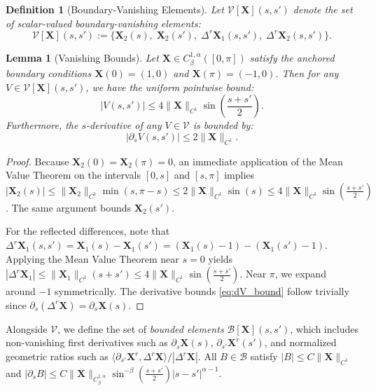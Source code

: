 \documentclass{amsart}
\newtheorem{definition}[theorem]{Definition}
\newtheorem{lemma}[theorem]{Lemma}
\begin{document}
\begin{definition}[Boundary-Vanishing Elements]  \label{def:boundaryvanishelement}
Let $\mathcal{V}[\mathbf{X}](s,s')$ denote the set of scalar-valued boundary-vanishing elements:
\[
\mathcal{V}[\mathbf{X}](s,s') := \big\{ \mathbf{X}_2(s),\; \mathbf{X}_2(s'),\; \Delta^r \mathbf{X}_1(s,s'),\; \Delta^r \mathbf{X}_2(s,s') \big\}.
\]
\end{definition}

\begin{lemma}[Vanishing Bounds]\label{lem:vanishing_bounds}
Let $\mathbf{X} \in C^{1,\alpha}_\beta([0,\pi])$ satisfy the anchored boundary conditions $\mathbf{X}(0) = (1,0)$ and $\mathbf{X}(\pi) = (-1,0)$. Then for any $V \in \mathcal{V}[\mathbf{X}](s,s')$, we have the uniform pointwise bound:
\[
|V(s,s')| \le 4 \|\mathbf{X}\|_{C^1} \sin\left(\frac{s+s'}{2}\right).
\]
Furthermore, the $s$-derivative of any $V \in \mathcal{V}$ is bounded by:
\begin{equation}\label{eq:dV_bound}
|\partial_s V(s,s')| \le 2 \|\mathbf{X}\|_{C^1}.
\end{equation}
\end{lemma}

\begin{proof}
Because $\mathbf{X}_2(0) = \mathbf{X}_2(\pi) = 0$, an immediate application of the Mean Value Theorem on the intervals $[0,s]$ and $[s,\pi]$ implies $|\mathbf{X}_2(s)| \le \|\mathbf{X}_2\|_{C^1} \min(s, \pi-s) \le 2\|\mathbf{X}\|_{C^1} \sin(s) \le 4\|\mathbf{X}\|_{C^1} \sin(\frac{s+s'}{2})$. The same argument bounds $\mathbf{X}_2(s')$.

For the reflected differences, note that $\Delta^r \mathbf{X}_1(s,s') = \mathbf{X}_1(s) - \mathbf{X}_1(s') = (\mathbf{X}_1(s) - 1) - (\mathbf{X}_1(s') - 1)$. Applying the Mean Value Theorem near $s=0$ yields $|\Delta^r \mathbf{X}_1| \le \|\mathbf{X}_1\|_{C^1}(s + s') \le 4\|\mathbf{X}\|_{C^1} \sin(\frac{s+s'}{2})$. Near $\pi$, we expand around $-1$ symmetrically. The derivative bounds \eqref{eq:dV_bound} follow trivially since $\partial_s (\Delta^r \mathbf{X}) = \partial_s \mathbf{X}(s)$.
\end{proof}

Alongside $\mathcal{V}$, we define the set of \emph{bounded elements} $\mathcal{B}[\mathbf{X}](s,s')$, which includes non-vanishing first derivatives such as $\partial_s \mathbf{X}(s)$, $\partial_{s'} \mathbf{X}^r(s')$, and normalized geometric ratios such as $\langle \partial_{s'}\mathbf{X}^r, \Delta^r \mathbf{X} \rangle / |\Delta^r \mathbf{X}|$. All $B \in \mathcal{B}$ satisfy $|B| \le C \|\mathbf{X}\|_{C^1}$ and $|\partial_s B| \le C \|\mathbf{X}\|_{C^{1,\alpha}_\beta} \sin^{-\beta}(\frac{s+s'}{2}) |s-s'|^{\alpha-1}$.
\end{document}
